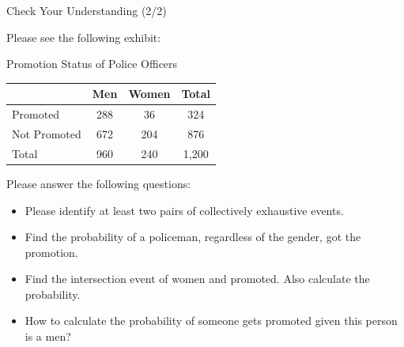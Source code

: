 \documentclass{beamer}
\begin{document}
\begin{frame}{Check Your Understanding (2/2)}

Please see the following exhibit: 

\begin{center}
Promotion Status of Police Officers
\vspace{0.2 cm}

\begin{tabular}{l|c|c|c}
\hline 
 & Men & Women & Total \\ 
\hline 
Promoted & 288 & 36 & 324 \\ 
\hline 
Not Promoted & 672 & 204 & 876 \\ 
\hline 
Total & 960 & 240 & 1,200 \\ 
\hline 
\end{tabular}
\end{center}

Please answer the following questions: 
\begin{itemize}
\item Please identify at least two pairs of collectively exhaustive events.
\item Find the probability of a policeman, regardless of the gender, got the promotion. 
\item Find the intersection event of women and promoted. Also calculate the probability.
\item How to calculate the probability of someone gets promoted given this person is a men? 
\end{itemize}

\end{frame}
\end{document}
